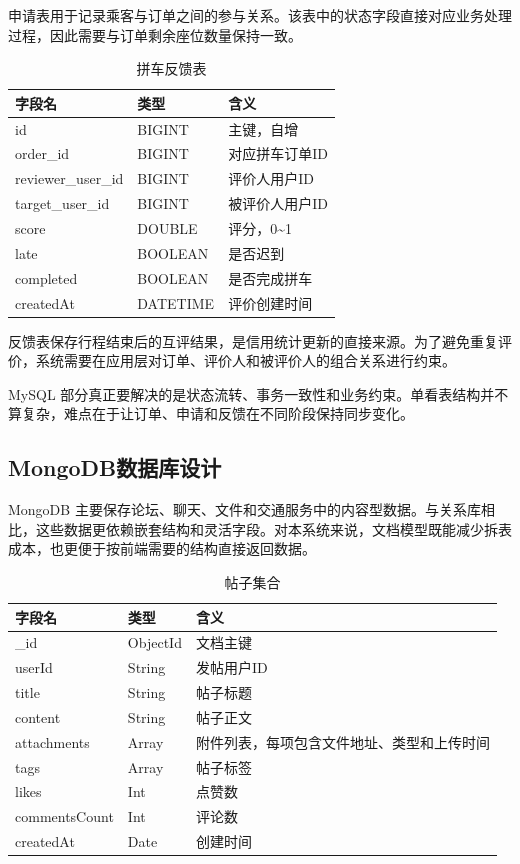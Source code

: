 申请表用于记录乘客与订单之间的参与关系。该表中的状态字段直接对应业务处理过程，因此需要与订单剩余座位数量保持一致。

\begin{table}[!htbp]
  \caption{拼车反馈表}
  \label{tab:carpool-feedback-table}
  \centering
  \small
  \begin{tabular}{p{3.0cm}p{2.3cm}p{7.0cm}}
    \toprule
    字段名 & 类型 & 含义 \\
    \midrule
    id & BIGINT & 主键，自增 \\
    order\_id & BIGINT & 对应拼车订单ID \\
    reviewer\_user\_id & BIGINT & 评价人用户ID \\
    target\_user\_id & BIGINT & 被评价人用户ID \\
    score & DOUBLE & 评分，0\textasciitilde1 \\
    late & BOOLEAN & 是否迟到 \\
    completed & BOOLEAN & 是否完成拼车 \\
    createdAt & DATETIME & 评价创建时间 \\
    \bottomrule
  \end{tabular}
\end{table}

反馈表保存行程结束后的互评结果，是信用统计更新的直接来源。为了避免重复评价，系统需要在应用层对订单、评价人和被评价人的组合关系进行约束。

MySQL 部分真正要解决的是状态流转、事务一致性和业务约束。单看表结构并不算复杂，难点在于让订单、申请和反馈在不同阶段保持同步变化。

\subsection{MongoDB数据库设计}

MongoDB 主要保存论坛、聊天、文件和交通服务中的内容型数据。与关系库相比，这些数据更依赖嵌套结构和灵活字段。对本系统来说，文档模型既能减少拆表成本，也更便于按前端需要的结构直接返回数据。

\begin{table}[!htbp]
  \caption{帖子集合}
  \label{tab:posts-collection}
  \centering
  \small
  \begin{tabular}{p{3.0cm}p{2.3cm}p{7.0cm}}
    \toprule
    字段名 & 类型 & 含义 \\
    \midrule
    \_id & ObjectId & 文档主键 \\
    userId & String & 发帖用户ID \\
    title & String & 帖子标题 \\
    content & String & 帖子正文 \\
    attachments & Array & 附件列表，每项包含文件地址、类型和上传时间 \\
    tags & Array & 帖子标签 \\
    likes & Int & 点赞数 \\
    commentsCount & Int & 评论数 \\
    createdAt & Date & 创建时间 \\
    \bottomrule
  \end{tabular}
\end{table}

